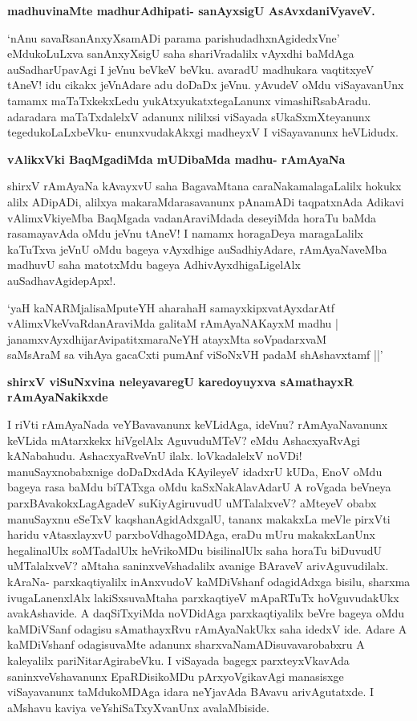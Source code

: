 \noindent
{\bf\large{madhuvinaMte madhurAdhipati- sanAyxsigU AsAvxdaniVyaveV.}}\label{page238}

`nAnu savaRsanAnxyXsamADi parama parishudadhxnAgidedxVne' eMdukoLuLxva sanAnxyXsigU saha shariVradalilx vAyxdhi baMdAga auSadharUpavAgi I jeVnu beVkeV beVku. avaradU madhukara vaqtitxyeV tAneV! idu cikakx jeVnAdare adu doDaDx jeVnu. yAvudeV oMdu viSayavanUnx tamamx maTaTxkekxLedu yukAtxyukatxtegaLanunx vimashiRsabAradu. adaradara maTaTxdalelxV adanunx nililxsi viSayada sUkaSxmXteyanunx tegedukoLaLxbeVku- enunxvudakAkxgi madheyxV I viSayavanunx heVLidudx.

\noindent
{\bf\large{vAlikxVki BaqMgadiMda mUDibaMda madhu- rAmAyaNa}}\label{page238}

shirxV rAmAyaNa kAvayxvU saha BagavaMtana caraNakamalagaLalilx hokukx alilx ADipADi, alilxya makaraMdarasavanunx pAnamADi taqpatxnAda Adikavi vAlimxVkiyeMba BaqMgada vadanAraviMdada deseyiMda horaTu baMda rasamayavAda oMdu jeVnu tAneV! I namamx horagaDeya maragaLalilx kaTuTxva jeVnU oMdu bageya vAyxdhige auSadhiyAdare, rAmAyaNaveMba madhuvU saha matotxMdu bageya AdhivAyxdhigaLigelAlx auSadhavAgidepApx!.

\begin{shloka}
`yaH kaNARMjalisaMputeYH aharahaH samayxkipxvatAyxdarAtf\\\label{238}
vAlimxVkeVvaRdanAraviMda galitaM rAmAyaNAKayxM madhu |\\
janamxvAyxdhijarAvipatitxmaraNeYH atayxMta soVpadarxvaM \\
saMsAraM sa vihAya gacaCxti pumAnf viSoNxVH padaM shAshavxtamf ||'
\end{shloka}

\noindent
{\bf\large{shirxV viSuNxvina neleyavaregU karedoyuyxva sAmathayxR rAmAyaNakikxde}}\label{page238}

I riVti rAmAyaNada veYBavavanunx keVLidAga, ideVnu? rAmAyaNavanunx keVLida mAtarxkekx hiVgelAlx AguvuduMTeV? eMdu AshacxyaRvAgi kANabahudu. AshacxyaRveVnU ilalx. loVkadalelxV noVDi! manuSayxnobabxnige doDaDxdAda KAyileyeV idadxrU kUDa, EnoV oMdu bageya rasa baMdu biTATxga oMdu kaSxNakAlavAdarU A roVgada beVneya parxBAvakokxLagAgadeV suKiyAgiruvudU uMTalalxveV? aMteyeV obabx manuSayxnu eSeTxV kaqshanAgidAdxgalU, tananx makakxLa meVle pirxVti haridu vAtasxlayxvU parxboVdhagoMDAga, eraDu mUru makakxLanUnx hegalinalUlx soMTadalUlx heVrikoMDu bisilinalUlx saha horaTu biDuvudU uMTalalxveV? aMtaha saninxveVshadalilx avanige BAraveV arivAguvudilalx. kAraNa- parxkaqtiyalilx inAnxvudoV kaMDiVshanf odagidAdxga bisilu, sharxma ivugaLanenxlAlx lakiSxsuvaMtaha parxkaqtiyeV mApaRTuTx hoVguvudakUkx avakAshavide. A daqSiTxyiMda noVDidAga parxkaqtiyalilx beVre bageya oMdu kaMDiVSanf odagisu sAmathayxRvu rAmAyaNakUkx saha idedxV ide. Adare A kaMDiVshanf odagisuvaMte adanunx sharxvaNamADisuvavarobabxru A kaleyalilx pariNitarAgirabeVku. I viSayada bagegx parxteyxVkavAda saninxveVshavanunx EpaRDisikoMDu pArxyoVgikavAgi manasisxge viSayavanunx taMdukoMDAga idara neYjavAda BAvavu arivAgutatxde. I aMshavu kaviya veYshiSaTxyXvanUnx avalaMbiside.

